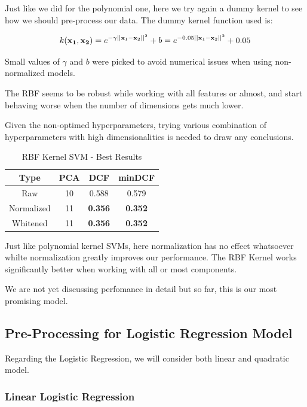 \documentclass[12pt, twocolumn]{article}
\begin{document}
Just like we did for the polynomial one, here we try again a dummy kernel to see how we should pre-process our data.
The dummy kernel function used is: 

$$\displaystyle k({\bf x_1}, {\bf x_2}) = e^{-\gamma||{\bf x}_1 - {\bf x}_2||^2} + b = e^{-0.05||{\bf x}_1 - {\bf x}_2||^2} + 0.05 $$

Small values of $\gamma$ and $b$ were picked to avoid numerical issues when using non-normalized models.

The RBF seems to be robust while working with all features or almost, and start behaving worse when the number of dimensions gets much lower.

Given the non-optimed hyperparameters, trying various combination of hyperparameters with high dimensionalities is needed to draw any conclusions.

\begin{table}[H]
    \centering
        \begin{tabular}{||c|c|c|c||}
            \hline
            Type & PCA & DCF & minDCF \\
            \hline
            \hline
                Raw & 10 & 0.588 & 0.579 \\ 
                Normalized & 11 & {\bf 0.356} & {\bf 0.352} \\ 
                Whitened & 11 & {\bf 0.356} & {\bf 0.352} \\ 
            \hline
    \end{tabular}
    \caption{RBF Kernel SVM - Best Results}
\end{table}

Just like polynomial kernel SVMs, here normalization has no effect whatsoever whilte normalization greatly improves our performance.
The RBF Kernel works significantly better when working with all or most components. 

We are not yet discussing perfomance in detail but so far, this is our most promising model.

\subsection{Pre-Processing for Logistic Regression Model}

Regarding the Logistic Regression, we will consider both linear and quadratic model.

\subsubsection{Linear Logistic Regression}
\end{document}
